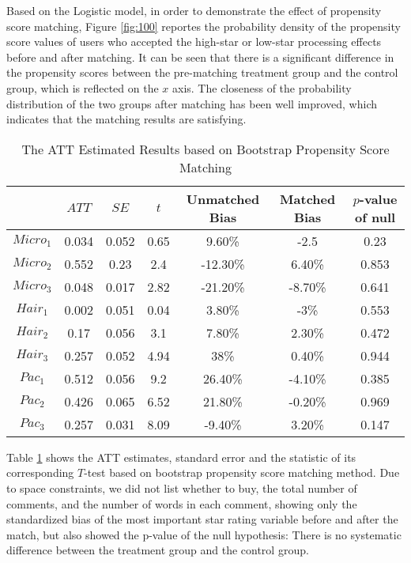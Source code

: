 \documentclass{mcmthesis}
\begin{document}
Based on the Logistic model, in order to demonstrate the effect of propensity score matching, Figure \ref{fig:100} reportes the probability density of the propensity score values of users who accepted the high-star or low-star processing effects before and after matching. It can be seen that there is a significant difference in the propensity scores between the pre-matching treatment group and the control group, which is reflected on the $x$ axis. The closeness of the probability distribution of the two groups after matching has been well improved, which indicates that the matching results are satisfying.




\begin{table}[htbp]
	\centering
	\caption{The ATT Estimated Results based on Bootstrap Propensity Score Matching}
	\begin{tabular}{ccccccc}
		\toprule[2pt]
		& $ ATT $   & $ SE $    & $ t $  & Unmatched Bias & Matched Bias & $ p $-value of null \\ \hline
		$ Micro_1 $ & 0.034 & 0.052 & 0.65        & 9.60\%         & -2.5         & 0.23                \\
		$ Micro_2 $ & 0.552 & 0.23  & 2.4         & -12.30\%       & 6.40\%       & 0.853               \\
		$ Micro_3 $ & 0.048 & 0.017 & 2.82        & -21.20\%       & -8.70\%      & 0.641               \\
		$ Hair_1 $  & 0.002 & 0.051 & 0.04        & 3.80\%         & -3\%         & 0.553               \\
		$ Hair_2 $  & 0.17  & 0.056 & 3.1         & 7.80\%         & 2.30\%       & 0.472               \\
		$ Hair_3 $  & 0.257 & 0.052 & 4.94        & 38\%           & 0.40\%       & 0.944               \\
		$ Pac_1 $   & 0.512 & 0.056 & 9.2         & 26.40\%        & -4.10\%      & 0.385               \\
		$ Pac_2 $   & 0.426 & 0.065 & 6.52        & 21.80\%        & -0.20\%      & 0.969               \\
		$ Pac_3 $   & 0.257 & 0.031 & 8.09        & -9.40\%        & 3.20\%       & 0.147               \\ \bottomrule[2pt]
	\end{tabular}
\label{tab:100}
\end{table}        
Table \ref{tab:100} shows the ATT estimates, standard error and the statistic of its corresponding $T$-test based on bootstrap propensity score matching method. Due to space constraints, we did not list whether to buy, the total number of comments, and the number of words in each comment, showing only the standardized bias of the most important star rating variable before and after the match, but also showed the p-value of the null hypothesis: There is no systematic difference between the treatment group and the control group.
\end{document}
